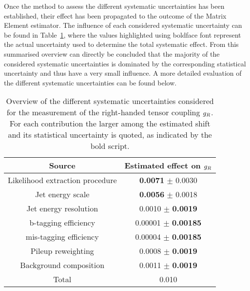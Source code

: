 Once the method to assess the different systematic uncertainties has been established, their effect has been propagated to the outcome of the Matrix Element estimator.
The influence of each considered systematic uncertainty can be found in Table~\ref{table::SystValues}, where the values highlighted using boldface font represent the actual uncertainty used to determine the total systematic effect.
From this summarised overview can directly be concluded that the majority of the considered systematic uncertainties is dominated by the corresponding statistical uncertainty and thus have a very small
influence.
A more detailed evaluation of the different systematic uncertainties can be found below.
\\
\begin{table}[h!t]
 \centering
 \caption{Overview of the different systematic uncertainties considered for the measurement of the right-handed tensor coupling $g_{R}$. For each contribution the larger among the estimated shift and its statistical uncertainty is quoted, as indicated by the bold script.} \label{table::SystValues}
 \renewcommand{\arraystretch}{1.2}
 \begin{tabular}{|c|c|}
  \hline
  Source 				& Estimated effect on $g_{R}$ 	\\
  \hline
  Likelihood extraction procedure 	& \textbf{0.0071} $\pm$ 0.0030 	\\
  Jet energy scale 	 		& \textbf{0.0056} $\pm$ 0.0018 	\\
  Jet energy resolution 		& 0.0010 $\pm$  \textbf{0.0019} 				\\
  b-tagging efficiency 			& 0.00001 $\pm$ \textbf{0.00185} 	\\
  mis-tagging efficiency  		& 0.00004 $\pm$ \textbf{0.00185} 	\\
  Pileup reweighting  			& 0.0008 $\pm$ \textbf{0.0019} 	\\
  Background composition 	 	& 0.0011 $\pm$ \textbf{0.0019} 	\\
  \hline
  Total 				& 0.010				\\
  \hline
 \end{tabular}
\end{table}

